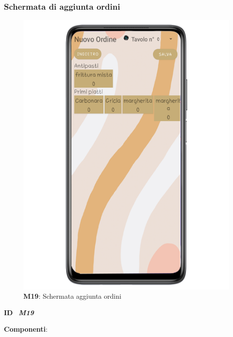                     \subsubsection{Schermata di aggiunta ordini}
                          \begin{figure}[H]
                            \centering
                            \includegraphics[scale=2]{assets/Mockup/Mockup_AddOrder.png}
                            \caption*{\textbf{M19}: Schermata aggiunta ordini}\label{fig:Mockup_WaiterDash}
                          \end{figure}
                
                          \begin{flushleft}
                            \textbf{ID}   \ \Large{\textit{\textbf{M19}}}
                          \end{flushleft}
                
                          \textbf{Componenti}:
                          
